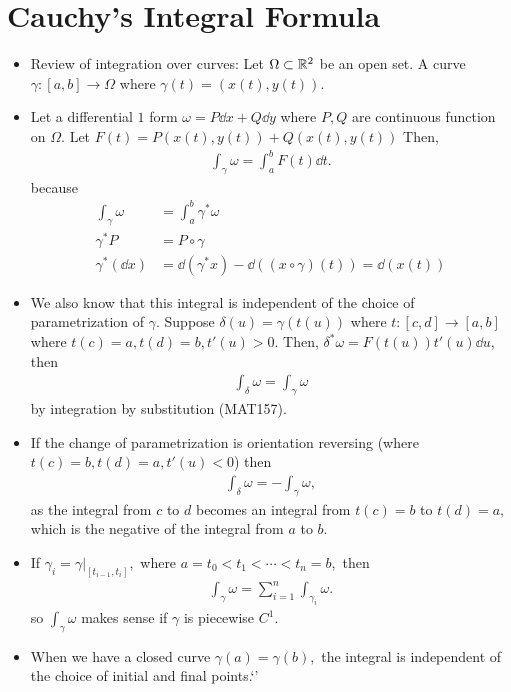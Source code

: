 \documentclass[a4paper,12pt]{article}
\begin{document}
\section{Cauchy's Integral Formula}
\begin{itemize}
    \item Review of integration over curves: Let $\Omega\subset\mathbb{R}^2$ be an open set. A curve $\gamma:[a,b]\to\Omega$ where $\gamma(t)=(x(t),y(t)).$
    \item Let a differential $1$ form $\omega=P\dd x+Q\dd y$ where $P,Q$ are continuous function on $\Omega.$ Let $F(t)=P(x(t),y(t))+Q(x(t),y(t))$ Then, \begin{align}
        \int_\gamma\omega=\int_a^bF(t)\dd t.
    \end{align}
    because \begin{align}
        \int_\gamma\omega&=\int_a^b\gamma^*\omega\\
        \gamma^*P&=P\circ\gamma\\
        \gamma^*(\dd x)&=\dd(\gamma^*x)-\dd((x\circ\gamma)(t))=\dd(x(t))
    \end{align}
    \item We also know that this integral is independent of the choice of parametrization of $\gamma.$ Suppose $\delta(u)=\gamma(t(u))$ where $t:[c,d]\to[a,b]$ where $t(c)=a,t(d)=b,t'(u)>0.$ Then, $\delta^*\omega=F(t(u))t'(u)\dd u,$ then \begin{align}
        \int_\delta\omega=\int_\gamma\omega
    \end{align}
    by integration by substitution (MAT157).
    \item If the change of parametrization is orientation reversing (where $t(c)=b,t(d)=a,t'(u)<0$) then \begin{align}
        \int_\delta\omega=-\int_\gamma\omega,
    \end{align}
    as the integral from $c$ to $d$ becomes an integral from $t(c)=b$ to $t(d)=a,$ which is the negative of the integral from $a$ to $b.$
    \item If $\gamma_i=\gamma|_{[t_{i-1},t_i]},$ where $a=t_0<t_1<\cdots<t_n=b,$ then \begin{align}
        \int_\gamma\omega=\sum_{i=1}^n\int_{\gamma_i}\omega.
    \end{align}
    so $\int_\gamma\omega$ makes sense if $\gamma$ is piecewise $C^1.$
    \item When we have a closed curve $\gamma(a)=\gamma(b),$ the integral is independent of the choice of initial and final points.`'
\end{itemize}
\end{document}
